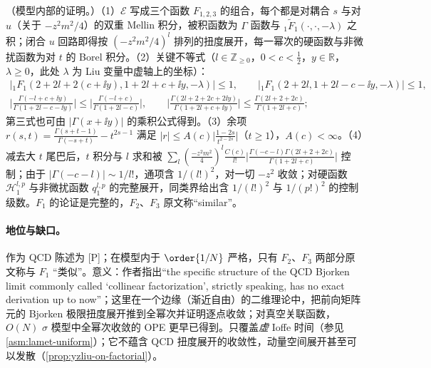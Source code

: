 \begin{proofsketch}
（模型内部的证明\cite[第~2、4~节]{Liu:2024omb}。）（1）$\mathcal E$ 写成三个函数 $F_{1,2,3}$ 的组合，每个都是对耦合 $s$ 与对 $u$（关于 $-z^2m^2/4$）的双重 Mellin 积分，被积函数为 $\Gamma$ 函数与 $_1\tilde F_1(\cdot,\cdot,-\lambda)$ 之积；闭合 $u$ 回路即得按 $(-z^2m^2/4)^l$ 排列的扭度展开，每一幂次的硬函数与非微扰函数为对 $t$ 的 Borel 积分\cite[式~(2.4)、(2.6)--(2.15)]{Liu:2024omb}。（2）关键不等式（$l\in\mathbb Z_{\ge0}$，$0<c<\frac12$，$y\in\mathbb R$，$\lambda\ge0$，此处 $\lambda$ 为 Liu 变量中虚轴上的坐标）\cite[式~(4.2)--(4.5)]{Liu:2024omb}：
\begin{gather*}
\big|{}_1F_1(2+2l+2(c+\ii y),1+2l+c+\ii y,-\lambda)\big|\le1,\qquad\big|{}_1F_1(2+2l,1+2l-c-\ii y,-\lambda)\big|\le1,\\
\Big|\frac{\Gamma(-l+c+\ii y)}{\Gamma(1+2l-c-\ii y)}\Big|\le\Big|\frac{\Gamma(-l+c)}{\Gamma(1+2l-c)}\Big|,\qquad\Big|\frac{\Gamma(2l+2+2c+2\ii y)}{\Gamma(1+2l+c+\ii y)}\Big|\le\frac{\Gamma(2l+2+2c)}{\Gamma(1+2l+c)} ;
\end{gather*}
第三式也可由 $|\Gamma(x+\ii y)|$ 的乘积公式得到。（3）余项 $r(s,t)=\frac{\Gamma(s+t-1)}{\Gamma(-s+t)}-t^{2s-1}$ 满足 $|r|\le A(c)\big|\frac{1-2s}{t^{2-2s}}\big|$（$t\ge1$），$A(c)<\infty$\cite[式~(4.7)]{Liu:2024omb}。（4）减去大 $t$ 尾巴后，$t$ 积分与 $l$ 求和被 $\sum_l(\frac{-z^2m^2}{4})^l\frac{C(c)}{l!}\big|\frac{\Gamma(-c-l)\Gamma(2l+2+2c)}{\Gamma(1+2l+c)}\big|$ 控制；由于 $|\Gamma(-c-l)|\sim1/l!$，通项含 $1/(l!)^2$，对一切 $-z^2$ 收敛；对硬函数 $\mathcal H^{l,p}_1$ 与非微扰函数 $q^{l,p}_1$ 的完整展开，同类界给出含 $1/(l!)^2$ 与 $1/(p!)^2$ 的控制级数\cite[式~(4.11)、(4.13)]{Liu:2024omb}。$F_1$ 的论证是完整的，$F_2$、$F_3$ 原文称“similar”。
\end{proofsketch}

\paragraph{地位与缺口。}作为 QCD 陈述为 [P]；在模型内于 $\order{1/N}$ 严格，只有 $F_2$、$F_3$ 两部分原文称与 $F_1$ “类似”。意义：作者指出“the specific structure of the QCD Bjorken limit commonly called `collinear factorization', strictly speaking, has no exact derivation up to now”\cite[第~1~节]{Liu:2024omb}；这里在一个边缘（渐近自由）的二维理论中，把前向矩阵元的 Bjorken 极限扭度展开推到全幂次并证明逐点收敛；对真空关联函数，$O(N)$ $\sigma$ 模型中全幂次收敛的 OPE 更早已得到\cite{Beneke:1998eq}。只覆盖\emph{虚} Ioffe 时间（参见\cref{asm:lamet-uniform}）；它不蕴含 QCD 扭度展开的收敛性，动量空间展开甚至可以发散（\cref{prop:yzliu-on-factorial}）。

